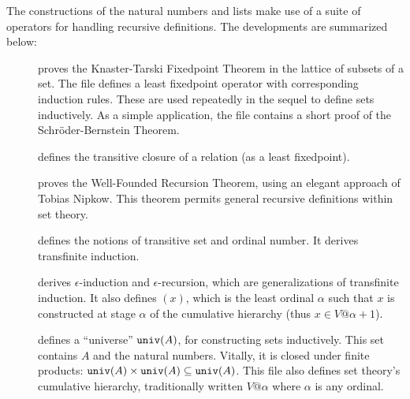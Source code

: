The constructions of the natural numbers and lists make use of a suite of
operators for handling recursive definitions.  The developments are
summarized below:
\begin{description}
\item[]
proves the Knaster-Tarski Fixedpoint Theorem in the lattice of subsets of a
set.  The file defines a least fixedpoint operator with corresponding
induction rules.  These are used repeatedly in the sequel to define sets
inductively.  As a simple application, the file contains a short proof of
the Schr\"oder-Bernstein Theorem.

\item[]
defines the transitive closure of a relation (as a least fixedpoint).

\item[]
proves the Well-Founded Recursion Theorem, using an elegant
approach of Tobias Nipkow.  This theorem permits general recursive
definitions within set theory.

\item[]
defines the notions of transitive set and ordinal number.  It derives
transfinite induction.

\item[]
derives $\epsilon$-induction and $\epsilon$-recursion, which are
generalizations of transfinite induction.  It also defines
$(x)$, which is the least ordinal $\alpha$ such that $x$
is constructed at stage $\alpha$ of the cumulative hierarchy (thus $x\in
V@{\alpha+1}$).

\item[]
defines a ``universe'' ${\tt univ}(A)$, for constructing sets inductively.
This set contains $A$ and the natural numbers.  Vitally, it is
closed under finite products: 
${\tt univ}(A)\times{\tt univ}(A)\subseteq{\tt univ}(A)$.  This file also
defines set theory's cumulative hierarchy, traditionally written $V@\alpha$
where $\alpha$ is any ordinal.
\end{description}


